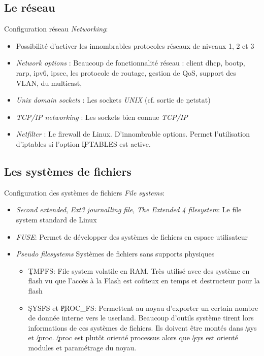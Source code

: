 \subsection{Le réseau}

\begin{frame}[fragile=singleslide]{Configuration réseau}
  \emph{Networking}:
  \begin{itemize}
  \item Possibilité  d'activer les innombrables  protocoles réseaux de
    niveaux 1, 2 et 3
  \item  \emph{Network options} : Beaucoup  de fonctionnalité  réseau :
    client dhcp,  bootp, rarp, ipv6, ipsec, les  protocole de routage,
    gestion de QoS, support des VLAN, du multicast,
  \item   \emph{Unix  domain  sockets}   :  Les   sockets  \emph{UNIX}
    (cf. sortie de \c{netstat})
  \item   \emph{TCP/IP   networking}  :   Les   sockets  bien   connue
    \emph{TCP/IP}
  \item  \emph{Netfilter}  :  Le  firewall  de  Linux.   D'innombrable
    options.  Permet l'utilisation d'iptables si l'option \c{IPTABLES}
    est active.
  \end{itemize} 
\end{frame}

\subsection{Les systèmes de fichiers}

\begin{frame}[fragile=singleslide]{Configuration des systèmes de fichiers}
  \emph{File systems}:
  \begin{itemize}
  \item   \emph{Second   extended},   \emph{Ext3  journalling   file},
    \emph{The Extended 4 filesystem}: Le file system standard de Linux
  \item \emph{FUSE}: Permet de  développer des systèmes de fichiers en
    espace utilisateur
  \item \emph{Pseudo  filesystems} Systèmes de  fichiers sans supports
    physiques
    \begin{itemize} 
    \item \c{TMPFS}: File system  volatile en RAM.  Très utilisé avec
      des système en flash vu que  l'accès à la Flash est coûteux en
      temps et destructeur pour la flash
    \item \c{SYSFS} et \c{PROC_FS}:  Permettent au noyau d'exporter un
      certain  nombre de  donnée interne  vers le  userland.  Beaucoup
      d'outils  système tirent  lors informations  de ces  systèmes de
      fichiers.  Ils  doivent être montés dans  \c{/sys} et \c{/proc}.
      \c{/proc} est  plutôt orienté  processus alors que  \c{/sys} est
      orienté modules et paramétrage du noyau.
    \end{itemize} 
  \end{itemize}
\end{frame}

